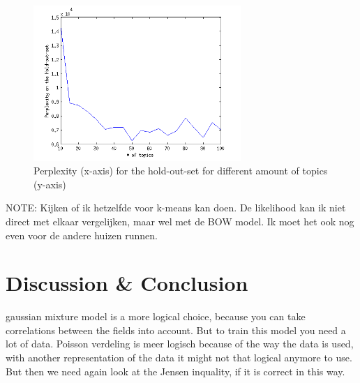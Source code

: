 \documentclass[11pt,a4paper]{article}
\begin{document}
\begin{figure}
 \centering
 \includegraphics[width = 0.7\textwidth]{Pictures/OutcomeExp4.png}
 \caption{Perplexity (x-axis) for the hold-out-set for different amount of topics (y-axis)}
 \label{fig:Perplexity}
\end{figure}

NOTE:
Kijken of ik hetzelfde voor k-means kan doen. De likelihood kan ik niet direct met elkaar vergelijken, maar wel met de BOW model. Ik moet het ook nog even voor de andere huizen runnen.

% 
% 


\section{Discussion \& Conclusion}
\label{sec:DisCon}
gaussian mixture model is a more logical choice, because you can take correlations between the fields into account. But to train this model you need a lot of data.
Poisson verdeling is meer logisch because of the way the data is used, with another representation of the data it might not that logical anymore to use. But then we need again look at the Jensen inquality, if it is correct in this way.


\appendix

{}

\end{document}
